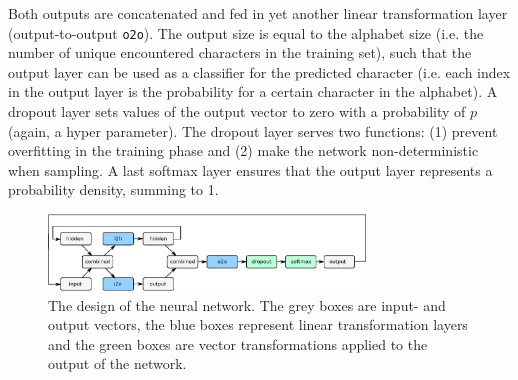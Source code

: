 Both outputs are concatenated and fed in yet another linear transformation layer (output-to-output {\tt o2o}).
The output size is equal to the alphabet size (i.e. the number of unique encountered characters in the training set), such that the output layer can be used as a classifier for the predicted character (i.e. each index in the output layer is the probability for a certain character in the alphabet).
A dropout layer sets values of the output vector to zero with a probability of $p$ (again, a hyper parameter).
The dropout layer serves two functions: (1) prevent overfitting in the training phase and (2) make the network non-deterministic when sampling.
A last softmax layer ensures that the output layer represents a probability density, summing to 1.

\begin{figure}[t]
	\label{fig:rnn}
	\centering
	\includegraphics[width=0.75\textwidth]{figures/rnn.eps} 
	\caption{The design of the neural network. The grey boxes are input- and output vectors, the blue boxes represent linear transformation layers and the green boxes are vector transformations applied to the output of the network.}
\end{figure}